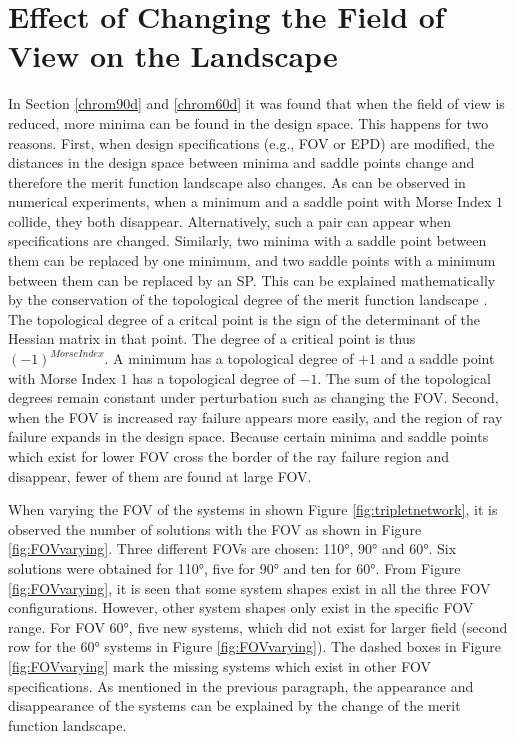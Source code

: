 \section{Effect of Changing the Field of View on the Landscape}
In Section \ref{chrom90d} and \ref{chrom60d} it was found that when the field of view is reduced, more minima can be found in the design space. This happens for two reasons. First, when design specifications (e.g., FOV or EPD) are modified, the distances in the design space between minima and saddle points change
and therefore the merit function landscape also changes. As can be observed in numerical experiments, when a minimum and a saddle point with Morse Index $1$ collide, they both disappear. Alternatively, such a pair can appear when specifications are changed. Similarly, two minima with a saddle point between them can be replaced by one minimum, and two saddle points with a minimum between them can be replaced by an SP. This can be explained mathematically by the conservation of the topological degree of the merit function landscape \cite{vanTurnhoutThesis2009} \cite{KoornwinderTopologicaldegree}. The topological degree of a critcal point is the sign of the determinant of the Hessian matrix in that point. The degree of a critical point is thus $(-1)^{Morse Index}$. A minimum has a topological degree of $+1$ and a saddle point with Morse Index $1$ has a topological degree of $-1$. The sum of the topological degrees remain constant under perturbation such as changing the FOV. Second, when the FOV is increased ray failure appears more easily, and the region of ray failure expands in the design space. Because certain minima and saddle points which exist for lower FOV cross the border of the ray failure region and disappear, fewer of them are found at large FOV.

 When varying the FOV of the systems in shown Figure \ref{fig:tripletnetwork}, it is observed the number of solutions with the FOV as shown in Figure \ref{fig:FOVvarying}. Three different FOVs are chosen: 110°, 90° and 60°. Six solutions were obtained for 110°, five for 90° and ten for 60°. From Figure \ref{fig:FOVvarying}, it is seen that some system shapes exist in all the three FOV configurations. However, other system shapes only exist in the specific FOV range.
For FOV 60°, five new systems, which did not exist for larger field (second row for the 60° systems in Figure \ref{fig:FOVvarying}). The dashed boxes in Figure \ref{fig:FOVvarying} mark the missing systems which exist in other FOV specifications. As mentioned in the previous paragraph, the appearance and disappearance of the systems can be explained by the change of the merit function landscape. 

